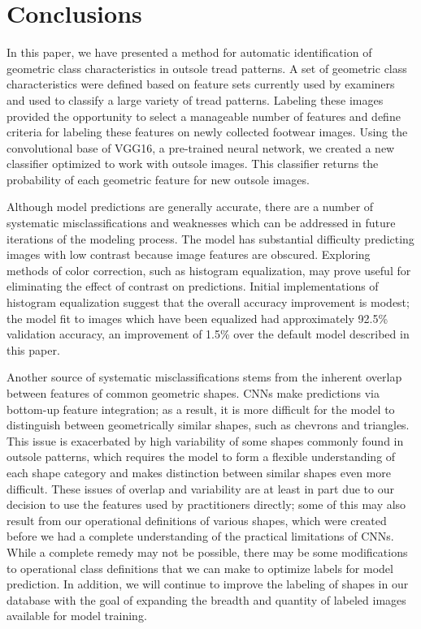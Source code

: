 \documentclass{article}\usepackage[]{graphicx}\usepackage[table]{xcolor}
\begin{document}
\section{Conclusions}

In this paper, we have presented a method for automatic identification of geometric class characteristics in outsole tread patterns. A set of geometric class characteristics were defined based on feature sets currently used by examiners and used to classify a large variety of tread patterns. Labeling these images provided the opportunity to select a manageable number of features and define criteria for labeling these features on newly collected footwear images. Using the convolutional base of VGG16, a pre-trained neural network, we created a new classifier optimized to work with outsole images. This classifier returns the probability of each geometric feature for new outsole images.

Although model predictions are generally accurate, there are a number of systematic misclassifications and weaknesses which can be addressed in future iterations of the modeling process. The model has substantial difficulty predicting images with low contrast because image features are obscured. Exploring methods of color correction, such as histogram equalization, may prove useful for eliminating the effect of contrast on predictions. Initial implementations of histogram equalization suggest that the overall accuracy improvement is modest; the model fit to images which have been equalized had approximately 92.5\% validation accuracy, an improvement of 1.5\% over the default model described in this paper.

Another source of systematic misclassifications stems from the inherent overlap between features of common geometric shapes. CNNs make predictions via bottom-up feature integration; as a result, it is more difficult for the model to distinguish between geometrically similar shapes, such as chevrons and triangles. This issue is exacerbated by high variability of some shapes commonly found in outsole patterns, which requires the model to form a flexible understanding of each shape category and makes distinction between similar shapes even more difficult. These issues of overlap and variability are at least in part due to our decision to use the features used by practitioners directly; some of this may also result from our operational definitions of various shapes, which were created before we had a complete understanding of the practical limitations of CNNs. While a complete remedy may not be possible, there may be some modifications to operational class definitions that we can make to optimize labels for model prediction. In addition, we will continue to improve the labeling of shapes in our database with the goal of expanding the breadth and quantity of labeled images available for model training.
\end{document}
